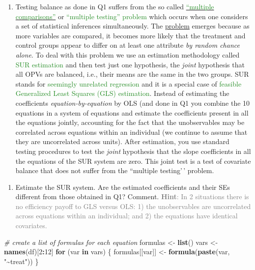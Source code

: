 \documentclass[
]{article}
\newenvironment{Shaded}{\begin{snugshade}}{\end{snugshade}}
\newcommand{\CommentTok}[1]{\textcolor[rgb]{0.56,0.35,0.01}{\textit{#1}}}
\newcommand{\ControlFlowTok}[1]{\textcolor[rgb]{0.13,0.29,0.53}{\textbf{#1}}}
\newcommand{\DecValTok}[1]{\textcolor[rgb]{0.00,0.00,0.81}{#1}}
\newcommand{\FunctionTok}[1]{\textcolor[rgb]{0.13,0.29,0.53}{\textbf{#1}}}
\newcommand{\NormalTok}[1]{#1}
\newcommand{\OtherTok}[1]{\textcolor[rgb]{0.56,0.35,0.01}{#1}}
\newcommand{\SpecialCharTok}[1]{\textcolor[rgb]{0.81,0.36,0.00}{\textbf{#1}}}
\newcommand{\StringTok}[1]{\textcolor[rgb]{0.31,0.60,0.02}{#1}}
\providecommand{\tightlist}{%
  \setlength{\itemsep}{0pt}\setlength{\parskip}{0pt}}
\begin{document}
\begin{enumerate}
\def\labelenumi{\arabic{enumi}.}
\setcounter{enumi}{1}
\tightlist
\item
  Testing balance as done in Q1 suffers from the so called
  \href{https://en.wikipedia.org/wiki/Multiple_comparisons_problem}{\textcolor{ForestGreen}{``multiple comparisons''}}
  or \textcolor{ForestGreen}{``multiple testing'' problem} which occurs
  when one considers a set of statistical inferences simultaneously. The
  \href{https://explainxkcd.com/wiki/index.php/882:_Significant}{problem}
  emerges because as more variables are compared, it becomes more likely
  that the treatment and control groups appear to differ on at least one
  attribute \textit{by random chance alone}. To deal with this problem
  we use an estimation methodology called
  \textcolor{ForestGreen}{SUR estimation} and then test just one
  hypothesis, the \textit{joint} hypothesis that all OPVs are balanced,
  i.e., their means are the same in the two groups. SUR stands for
  \textcolor{ForestGreen}{seemingly unrelated regression} and it is a
  special case of
  \textcolor{ForestGreen}{feasible Generalized Least Squares (GLS) estimation}.
  Instead of estimating the coefficients \textit{equation-by-equation}
  by OLS (and done in Q1 you combine the 10 equations in a system of
  equations and estimate the coefficients present in all the equations
  jointly, accounting for the fact that the unobservables may be
  correlated across equations within an individual (we continue to
  assume that they are uncorrelated across units). After estimation, you
  use standard testing procedures to test the \textit{joint} hypothesis
  that the slope coefficients in all the equations of the SUR system are
  zero. This joint test is a test of covariate balance that does not
  suffer from the ``multiple testing'\,' problem.
\end{enumerate}

\begin{enumerate}
\def\labelenumi{\alph{enumi}.}
\tightlist
\item
  Estimate the SUR system. Are the estimated coefficients and their SEs
  different from those obtained in Q1? Comment.
  \textcolor{gray}{\textbf{Hint}: In 2 situations there is no efficiency payoff to GLS versus OLS: 1) the unobservables are uncorrelated across equations within an individual; and 2) the equations have identical covariates.}
\end{enumerate}

\begin{Shaded}
\begin{Highlighting}[]
\CommentTok{\# create a list of formulas for each equation}
\NormalTok{formulas }\OtherTok{\textless{}{-}} \FunctionTok{list}\NormalTok{()}
\NormalTok{vars }\OtherTok{\textless{}{-}} \FunctionTok{names}\NormalTok{(df)[}\DecValTok{2}\SpecialCharTok{:}\DecValTok{12}\NormalTok{]}
\ControlFlowTok{for}\NormalTok{ (var }\ControlFlowTok{in}\NormalTok{ vars) \{}
\NormalTok{  formulas[[var]] }\OtherTok{\textless{}{-}} \FunctionTok{formula}\NormalTok{(}\FunctionTok{paste}\NormalTok{(var, }\StringTok{"\textasciitilde{}treat"}\NormalTok{))}
\NormalTok{\}}
\end{Highlighting}
\end{Shaded}
\end{document}
